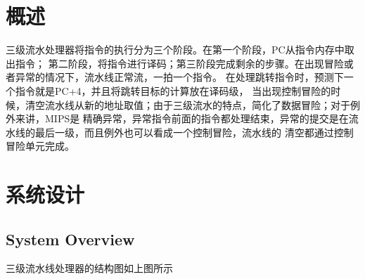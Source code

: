 \documentclass[UTF8]{ctexart}
\begin{document}


\section{概述} \label{overview}%
三级流水处理器将指令的执行分为三个阶段。在第一个阶段，PC从指令内存中取出指令；
第二阶段，将指令进行译码；第三阶段完成剩余的步骤。在出现冒险或者异常的情况下，流水线正常流，一拍一个指令。
在处理跳转指令时，预测下一个指令就是PC+4，并且将跳转目标的计算放在译码级，
当出现控制冒险的时候，清空流水线从新的地址取值；由于三级流水的特点，简化了数据冒险；对于例外来讲，MIPS是
精确异常，异常指令前面的指令都处理结束，异常的提交是在流水线的最后一级，而且例外也可以看成一个控制冒险，流水线的
清空都通过控制冒险单元完成。



\newpage
\section{系统设计} \label{sysdes}%
\subsection{System Overview}\label{sub:sysover}
三级流水线处理器的结构图如上图所示
\end{document}
